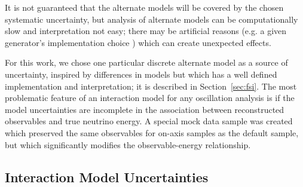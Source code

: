 It is not guaranteed that the alternate models will be covered by the chosen systematic uncertainty, but analysis  of alternate models can be computationally slow and interpretation not easy; there may be artificial reasons (e.g. a given generator's implementation choice ) which can create unexpected effects. 

For this work, we chose one particular discrete alternate model as a source of uncertainty, inspired by differences in models but which has a well defined implementation and interpretation; it is described in Section~\ref{sec:fsi}. The most problematic feature of an interaction model for any oscillation analysis is if the model uncertainties are incomplete in the association between reconstructed observables and true neutrino energy. A special mock data sample was created which preserved the same observables for on-axis samples as the default sample, but which significantly modifies the observable-energy relationship.


\subsection{Interaction Model Uncertainties}

